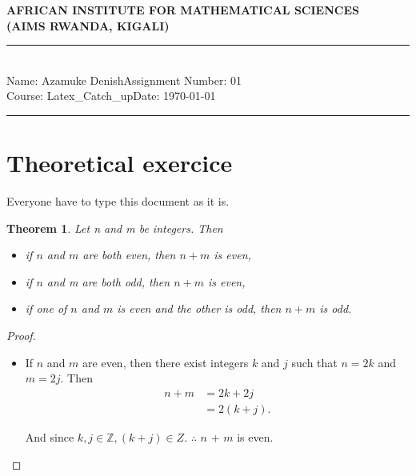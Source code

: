\documentclass[12pt,a4paper]{article}
\newcommand{\student}{Azamuke Denish}
\newcommand{\course}{Latex\_Catch\_up}
\newcommand{\assignment}{01}
\newtheorem{thm}{Theorem}
\begin{document}
\thispagestyle{empty}
\begin{center}
\textbf{AFRICAN INSTITUTE FOR MATHEMATICAL SCIENCES \\[0.5cm]
(AIMS RWANDA, KIGALI)}
\vspace{1.0cm}
\end{center}

\noindent
\rule{17cm}{0.2cm}\\[0.3cm]
Name: \student \hfill Assignment Number: \assignment\\[0.1cm]
Course: \course \hfill Date: \today\\
\rule{17cm}{0.05cm}
\vspace{1.0cm}

\section{Theoretical exercice}

Everyone have to type this document as it is.

\begin{thm}
Let n and m be integers. Then
\begin{itemize}
	\item [i.] if $n$ and $m$ are both even, then $n + m$ is even,
	
	\item [ii.] if $n$ and m are both odd, then $n + m$ is even,
	
	\item [iii.] if one of $n$ and $m$ is even and the other is odd, then $n + m$ is odd.
\end{itemize}

\end{thm}

\begin{proof}
	
 \begin{itemize}
 	\item [i.]  If $n$ and $m$ are even, then there exist integers $k$ and $j$ such that $n = 2k$ and $m = 2j$. Then
 	\begin{align*}
 		n + m &= 2k + 2j\\
 		&= 2(k + j).
 	\end{align*}
 	
 	
 	And since $k, j \in \mathbb{Z} , (k + j) \in Z$. $\therefore$ $n$ + $m$ is even.
 	 
 \end{itemize}
 
\end{proof}
\end{document}

